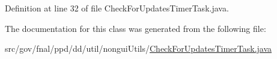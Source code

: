Definition at line 32 of file Check\-For\-Updates\-Timer\-Task.\-java.



The documentation for this class was generated from the following file\-:\begin{DoxyCompactItemize}
\item 
src/gov/fnal/ppd/dd/util/nongui\-Utils/\hyperlink{CheckForUpdatesTimerTask_8java}{Check\-For\-Updates\-Timer\-Task.\-java}\end{DoxyCompactItemize}
